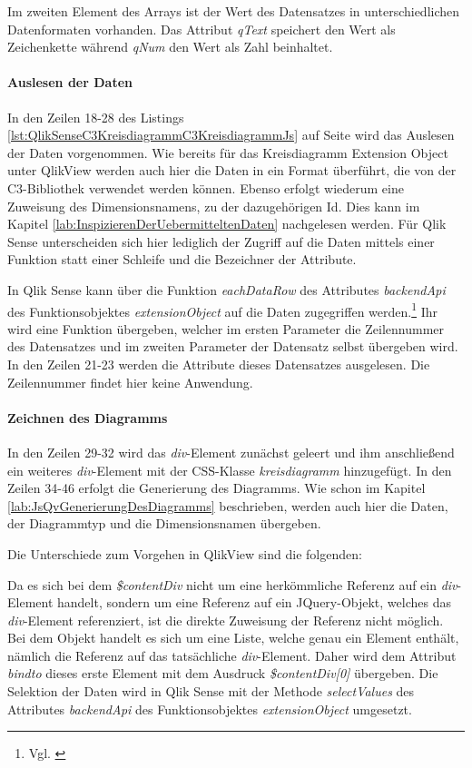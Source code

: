 Im zweiten Element des Arrays ist der Wert des Daten\-satzes in unterschiedlichen Daten\-formaten vorhanden. Das Attribut \textit{qText} speichert den Wert als Zeichenkette während \textit{qNum} den Wert als Zahl beinhaltet.

\paragraph{Auslesen der Daten}

In den Zeilen 18-28 des Listings \ref{lst:QlikSenseC3KreisdiagrammC3KreisdiagrammJs} auf Seite \pageref{lst:QlikSenseC3KreisdiagrammC3KreisdiagrammJs} wird das Auslesen der Daten vorgenommen. Wie bereits für das Kreisdiagramm Extension Object unter QlikView werden auch hier die Daten in ein Format überführt, die von der C3-Bibliothek verwendet werden können. Ebenso erfolgt wiederum eine Zuweisung des Dimensionsnamens, zu der dazugehörigen Id. Dies kann im Kapitel \ref{lab:InspizierenDerUebermitteltenDaten} nachgelesen werden. Für Qlik Sense unterscheiden sich hier lediglich der Zugriff auf die Daten mittels einer Funktion statt einer Schleife und die Bezeichner der Attribute.

In Qlik Sense kann über die Funktion \textit{eachDataRow} des Attributes \textit{backendApi} des Funktions\-objektes \textit{extensionObject} auf die Daten zugegriffen werden.\footnote{Vgl. \cite{eachDataRowMethod}} Ihr wird eine Funktion übergeben, welcher im ersten Parameter die Zeilen\-nummer des Daten\-satzes und im zweiten Parameter der Daten\-satz selbst übergeben wird. In den Zeilen 21-23 werden die Attribute dieses Daten\-satzes ausgelesen. Die Zeilennummer findet hier keine Anwendung.

\paragraph{Zeichnen des Diagramms}

In den Zeilen 29-32 wird das \textit{div}-Element zunächst geleert und ihm anschließend ein weiteres \textit{div}-Element mit der CSS-Klasse \textit{kreisdiagramm} hinzugefügt.
In den Zeilen 34-46 erfolgt die Generierung des Diagramms. Wie schon im Kapitel \ref{lab:JsQvGenerierungDesDiagramms} beschrieben, werden auch hier die Daten, der Diagrammtyp und die Dimensionsnamen über\-geben. 

Die Unterschiede zum Vorgehen in QlikView sind die folgenden:

Da es sich bei dem \textit{\$contentDiv} nicht um eine herkömmliche Referenz auf ein \textit{div}-Element handelt, sondern um eine Referenz auf ein JQuery-Objekt, welches das \textit{div}-Element referenziert, ist die direkte Zuweisung der Referenz nicht möglich. Bei dem Objekt handelt es sich um eine Liste, welche genau ein Element enthält, nämlich die Referenz auf das tatsächliche \textit{div}-Element. Daher wird dem Attribut \textit{bindto} dieses erste Element mit dem Ausdruck \textit{\$contentDiv[0]} übergeben. Die Selektion der Daten wird in Qlik Sense mit der Methode \textit{selectValues} des Attributes \textit{backendApi} des Funktionsobjektes \textit{extensionObject} umgesetzt. 

